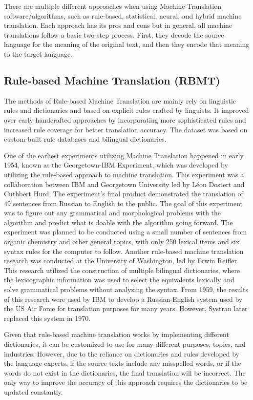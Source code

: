 \documentclass[sigconf]{acmart}
\begin{document}
    There are multiple different approaches when using Machine Translation software/algorithms, such as rule-based, statistical, neural, and hybrid machine translation. Each approach has its pros and cons but in general, all machine translations follow a basic two-step process. First, they decode the source language for the meaning of the original text, and then they encode that meaning to the target language\cite{Amazon_MT}.
    
    \subsection{Rule-based Machine Translation (RBMT)}
        The methods of Rule-based Machine Translation are mainly rely on linguistic rules and dictionaries and based on explicit rules crafted by linguists. It improved over early handcrafted approaches by incorporating more sophisticated rules and increased rule coverage for better translation accuracy. The dataset was based on custom-built rule databases and bilingual dictionaries. 
        
        One of the earliest experiments utilizing Machine Translation happened in early 1954, known as the Georgetown-IBM Experiment, which was developed by utilizing the rule-based approach to machine translation. This experiment was a collaboration between IBM and Georgetown University led by Léon Dostert and Cuthbert Hurd. The experiment's final product demonstrated the translation of 49 sentences from Russian to English to the public\cite{Hutchins_2001}. The goal of this experiment was to figure out any grammatical and morphological problems with the algorithm and predict what is doable with the algorithm going forward. The experiment was planned to be conducted using a small number of sentences from organic chemistry and other general topics, with only 250 lexical items and six syntax rules for the computer to follow\cite{Hutchins_2004}. Another rule-based machine translation research was conducted at the University of Washington, led by Erwin Reifler. This research utilized the construction of multiple bilingual dictionaries, where the lexicographic information was used to select the equivalents lexically and solve grammatical problems without analyzing the syntax. From 1959, the results of this research were used by IBM to develop a Russian-English system used by the US Air Force for translation purposes for many years. However, Systran later replaced this system in 1970\cite{Hutchins_2001}.

        Given that rule-based machine translation works by implementing different dictionaries, it can be customized to use for many different purposes, topics, and industries. However, due to the reliance on dictionaries and rules developed by the language experts, if the source texts include any misspelled words, or if the words do not exist in the dictionaries, the final translation will be incorrect. The only way to improve the accuracy of this approach requires the dictionaries to be updated constantly\cite{Amazon_MT}.
\end{document}
